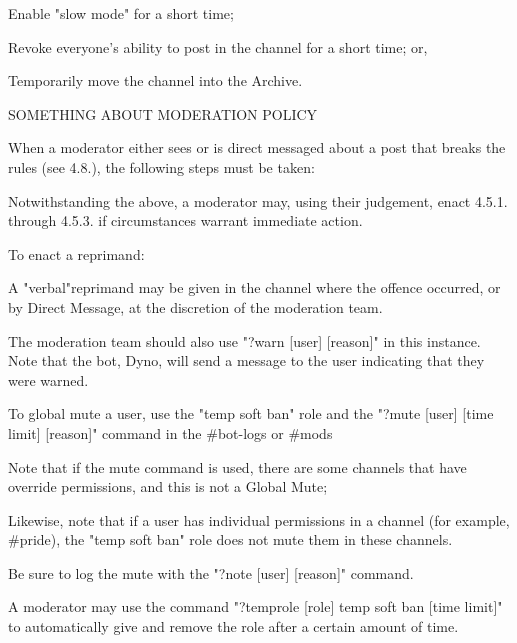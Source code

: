 \begin{longenum}[ label*=\thesubsection.\arabic*., align=left]
	\begin{longenum}[label*=\arabic*., align=left]
	\item Enable "slow mode" for a short time;
	\item Revoke everyone's ability to post in the channel for a short time; or, 
	\item Temporarily move the channel into the Archive.
	\end{longenum}
\item SOMETHING ABOUT MODERATION POLICY
	\begin{longenum}[label*=\arabic*., align=left]
	\item When a moderator either sees or is direct messaged about a post that breaks the rules (see 4.8.), the following steps must be taken:
	\item Notwithstanding the above, a moderator may, using their judgement, enact 4.5.1. through 4.5.3. if circumstances warrant immediate action.
	\item To enact a reprimand:
		\begin{longenum}[label*=\arabic*., align=left]
		\item A "verbal"reprimand may be given in the channel where the offence occurred, or by Direct Message, at the discretion of the moderation team.
			\begin{longenum}[label*=\arabic*., align=left]
			\item The moderation team should also use "?warn [user] [reason]" in this instance. Note that the bot, Dyno, will send a message to the user indicating that they were warned.
			\end{longenum}
		\item To global mute a user, use the "temp soft ban" role and the "?mute [user] [time limit] [reason]" command in the \#bot-logs or \#mods 
			\begin{longenum}[label*=\arabic*., align=left]
			\item Note that if the mute command is used, there are some channels that have override permissions, and this is not a Global Mute;
			\item Likewise, note that if a user has individual permissions in a channel (for example, \#pride), the "temp soft ban" role does not mute them in these channels.
			\item Be sure to log the mute with the "?note [user] [reason]" command.
			\item A moderator may use the command "?temprole [role] temp soft ban [time limit]" to automatically give and remove the role after a certain amount of time.

\end{longenum}
\end{longenum}
\end{longenum}
\end{longenum}
